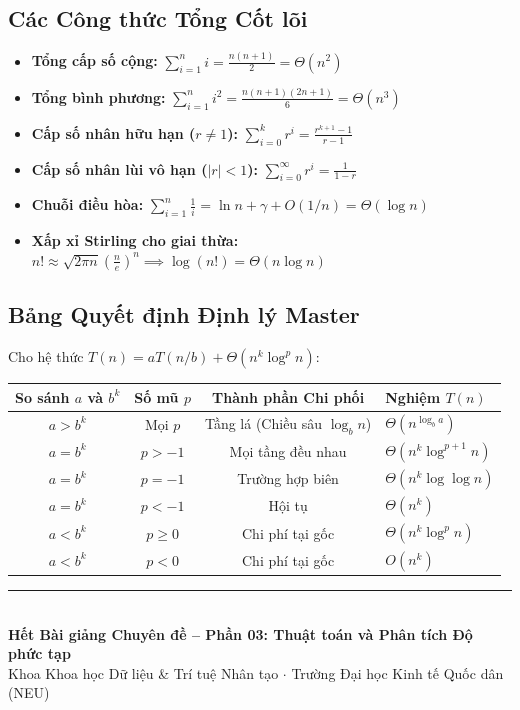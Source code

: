 \documentclass[11pt,a4paper]{article}
\begin{document}
\subsection{Các Công thức Tổng Cốt lõi}
\begin{itemize}[itemsep=3pt]
    \item \textbf{Tổng cấp số cộng:} $\sum_{i=1}^n i = \frac{n(n+1)}{2} = \Theta(n^2)$
    \item \textbf{Tổng bình phương:} $\sum_{i=1}^n i^2 = \frac{n(n+1)(2n+1)}{6} = \Theta(n^3)$
    \item \textbf{Cấp số nhân hữu hạn ($r \neq 1$):} $\sum_{i=0}^k r^i = \frac{r^{k+1} - 1}{r - 1}$
    \item \textbf{Cấp số nhân lùi vô hạn ($|r| < 1$):} $\sum_{i=0}^{\infty} r^i = \frac{1}{1 - r}$
    \item \textbf{Chuỗi điều hòa:} $\sum_{i=1}^n \frac{1}{i} = \ln n + \gamma + O(1/n) = \Theta(\log n)$
    \item \textbf{Xấp xỉ Stirling cho giai thừa:} $n! \approx \sqrt{2\pi n} \left(\frac{n}{e}\right)^n \implies \log(n!) = \Theta(n \log n)$
\end{itemize}

\subsection{Bảng Quyết định Định lý Master}
Cho hệ thức $T(n) = a T(n/b) + \Theta(n^k \log^p n)$:
\begin{center}
\begin{tabularx}{\textwidth}{c c c X}
\toprule
\textbf{So sánh $a$ và $b^k$} & \textbf{Số mũ $p$} & \textbf{Thành phần Chi phối} & \textbf{Nghiệm $T(n)$} \\
\midrule
$a > b^k$ & Mọi $p$ & Tầng lá (Chiều sâu $\log_b n$) & $\Theta(n^{\log_b a})$ \\
\midrule
$a = b^k$ & $p > -1$ & Mọi tầng đều nhau & $\Theta(n^k \log^{p+1} n)$ \\
$a = b^k$ & $p = -1$ & Trường hợp biên & $\Theta(n^k \log \log n)$ \\
$a = b^k$ & $p < -1$ & Hội tụ & $\Theta(n^k)$ \\
\midrule
$a < b^k$ & $p \ge 0$ & Chi phí tại gốc & $\Theta(n^k \log^p n)$ \\
$a < b^k$ & $p < 0$ & Chi phí tại gốc & $O(n^k)$ \\
\bottomrule
\end{tabularx}
\end{center}

\vspace{1.5em}
\begin{center}
\rule{0.6\textwidth}{0.6pt}\\[0.4em]
{\small\color{ForestGreen}\textbf{Hết Bài giảng Chuyên đề -- Phần 03: Thuật toán và Phân tích Độ phức tạp}}\\[0.2em]
{\footnotesize\color{DarkGray}Khoa Khoa học Dữ liệu \& Trí tuệ Nhân tạo $\cdot$ Trường Đại học Kinh tế Quốc dân (NEU)}
\end{center}
\end{document}
